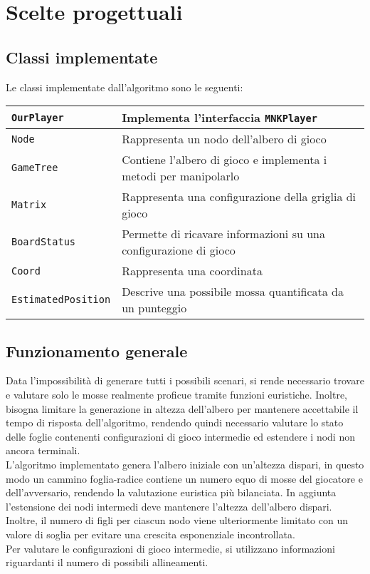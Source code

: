 \documentclass[11pt]{article}
\begin{document}
\section*{Scelte progettuali}
\subsection*{Classi implementate}
Le classi implementate dall'algoritmo sono le seguenti:
\begin{table}[H]	%
\centering			%
\def\arraystretch{1.5}
\begin{tabular}{|l|p{4in}|}	%
\hline	%
\texttt{OurPlayer} & Implementa l'interfaccia \texttt{MNKPlayer} \\ \hline
\texttt{Node} & Rappresenta un nodo dell'albero di gioco \\ \hline
\texttt{GameTree} & Contiene l'albero di gioco e implementa i metodi per manipolarlo \\ \hline
\texttt{Matrix} & Rappresenta una configurazione della griglia di gioco \\ \hline
\texttt{BoardStatus} & Permette di ricavare informazioni su una configurazione di gioco \\ \hline
\texttt{Coord} & Rappresenta una coordinata \\ \hline
\texttt{EstimatedPosition} & Descrive una possibile mossa quantificata da un punteggio \\ \hline
\end{tabular}
\end{table}

\subsection*{Funzionamento generale}
Data l'impossibilità di generare tutti i possibili scenari, si rende necessario trovare e valutare solo le mosse realmente proficue tramite funzioni euristiche. Inoltre, bisogna limitare la generazione in altezza dell'albero per mantenere accettabile il tempo di risposta dell'algoritmo, rendendo quindi necessario valutare lo stato delle foglie contenenti configurazioni di gioco intermedie ed estendere i nodi non ancora terminali.\\
L'algoritmo implementato genera l'albero iniziale con un'altezza dispari, in questo modo un cammino foglia-radice contiene un numero equo di mosse del giocatore e dell'avversario, rendendo la valutazione euristica più bilanciata.
In aggiunta l'estensione dei nodi intermedi deve mantenere l'altezza dell'albero dispari.\\
Inoltre, il numero di figli per ciascun nodo viene ulteriormente limitato con un valore di soglia per evitare una crescita esponenziale incontrollata.\\
Per valutare le configurazioni di gioco intermedie, si utilizzano informazioni riguardanti il numero di possibili allineamenti.
\end{document}
